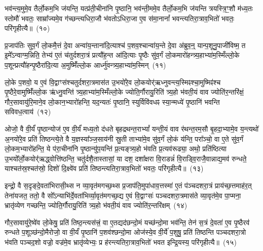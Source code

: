 भव॑न्त्य॒मुमे॒व तैर्लो॒कम॒भि ज॑यन्ति॒ यत्प्र॑ती॒चीना॑नि पृ॒ष्ठानि॒ भव॑न्ती॒ममे॒व तैर्लो॒कम॒भि ज॑यन्ति त्रयस्त्रि॒ꣳ॒शौ म॑ध्य॒तः स्तोमौ॑ भवतः॒ साम्रा᳚ज्यमे॒व ग॑च्छन्त्यधिरा॒जौ भ॑वतो\-ऽधिरा॒जा ए॒व स॑मा॒नानां᳚ भवन्त्यतिरा॒त्राव॒भितो॑ भवतः॒ परि॑गृहीत्यै॥~(१०)

{\anuvakamend[{पृ॒ष्ठानि॒ चतु॑स्त्रिꣳशच्च}]}%

प्र॒जा\-प॑तिः सुव॒र्गं लो॒कमै॒त्तं दे॒वा अन्वा॑य॒न्ताना॑दि॒त्याश्च॑ प॒शव॒श्चान्वा॑य॒न्ते दे॒वा अ॑ब्रुव॒न्॒ यान्प॒शूनु॒पाजी॑विष्म॒ त इ॒मे᳚\-ऽन्वाग्म॒न्निति॒ तेभ्य॑ ए॒तं च॑तुर्दशरा॒त्रं प्रत्यौ॑ह॒न्त आ॑दि॒त्याः पृ॒ष्ठैः सु॑व॒र्गं लो॒कमारो॑हन्त्र्य॒हाभ्या॑म॒स्मिँल्लो॒के प॒शून्प्रत्यौ॑हन्पृ॒ष्ठैरा॑दि॒त्या अ॒मुष्मिँ॑ल्लो॒क आर्ध्नु॑वन्त्र्य॒हाभ्या॑म॒स्मिन्~(११)

लो॒के प॒शवो॒ य ए॒वं वि॒द्वाꣳस॑श्चतुर्दशरा॒त्रमास॑त उ॒भयो॑रे॒व लो॒कयोर्॑ऋध्नुवन्त्य॒स्मिꣴश्चा॒मुष्मिꣴ॑श्च पृ॒ष्ठैरे॒वामुष्मिँ॑ल्लो॒क ऋ॑ध्नु॒वन्ति॑ त्र्य॒हाभ्या॑म॒स्मिँल्लो॒के ज्योति॒र्गौरायु॒रिति॑ त्र्य॒हो भ॑वती॒यं वाव ज्योति॑र॒न्तरि॑क्षं॒ गौर॒सावायु॑रि॒माने॒व लो॒कान॒भ्यारो॑हन्ति॒ यद॒न्यतः॑ पृ॒ष्ठानि॒ स्युर्विवि॑वधꣴ स्या॒न्मध्ये॑ पृ॒ष्ठानि॑ भवन्ति सविवध॒त्वाय॑~(१२)

ओजो॒ वै वी॒र्यं॑ पृ॒ष्ठान्योज॑ ए॒व वी॒र्यं॑ मध्य॒तो द॑धते बृहद्रथन्त॒रा\-भ्यां᳚ यन्ती॒यं वाव र॑थन्त॒रम॒सौ बृ॒हदा॒भ्यामे॒व य॒न्त्यथो॑ अ॒नयो॑रे॒व प्रति॑ तिष्ठन्त्ये॒ते वै य॒ज्ञस्या᳚ञ्ज॒साय॑नी स्रु॒ती ताभ्या॑मे॒व सु॑व॒र्गं लो॒कं य॑न्ति॒ परा᳚ञ्चो॒ वा ए॒ते सु॑व॒र्गं लो॒कम॒भ्यारो॑हन्ति॒ ये प॑रा॒चीना॑नि पृ॒ष्ठान्यु॑प॒यन्ति॑ प्र॒त्यङ्त्र्य॒हो भ॑वति प्र॒त्यव॑रूढ्या॒ अथो॒ प्रति॑ष्ठित्या उ॒भयो᳚र्लो॒कयोर्॑\mbox{}॑ऋद्ध्वोत्ति॑ष्ठन्ति॒ चतु॑र्दशै॒तास्तासां॒ या दश॒ दशा᳚क्षरा वि॒राडन्नं॑ वि॒राड्वि॒राजै॒वान्नाद्य॒मव॑ रुन्धते॒ याश्चत॑स्र॒श्चत॑स्रो॒ दिशो॑ दि॒क्ष्वे॑व प्रति॑ तिष्ठन्त्यतिरा॒त्राव॒भितो॑ भवतः॒ परि॑गृहीत्यै॥~(१३)

{\anuvakamend[{आर्ध्नु॑वन्त्र्य॒हाभ्या॑म॒स्मिन्थ्स॑विवध॒त्वाय॒ प्रति॑ष्ठित्या॒ एक॑त्रिꣳशच्च}]}%

इन्द्रो॒ वै स॒दृङ्दे॒वता॑भिरासी॒थ्स न व्या॒वृत॑मगच्छ॒थ्स प्र॒जा\-प॑ति॒मुपा॑धाव॒त्तस्मा॑ ए॒तं प॑ञ्चदशरा॒त्रं प्राय॑च्छ॒त्तमाह॑र॒त् तेना॑यजत॒ ततो॒ वै सो᳚\-ऽन्याभि॑र्दे॒वता॑भिर्व्या॒वृत॑मगच्छ॒द्य ए॒वं वि॒द्वाꣳसः॑ पञ्चदशरा॒त्रमास॑ते व्या॒वृत॑मे॒व पा॒प्मना॒ भ्रातृ॑व्येण गच्छन्ति॒ ज्योति॒र्गौरायु॒रिति॑ त्र्य॒हो भ॑वती॒यं वाव ज्योति॑र॒न्तरि॑क्षम्~(१४)

गौर॒सावायु॑रे॒ष्वे॑व लो॒केषु॒ प्रति॑ तिष्ठ॒न्त्यस॑त्त्रं॒ वा ए॒तद्यद॑छन्दो॒मं यच्छ॑न्दो॒मा भव॑न्ति॒ तेन॑ स॒त्रं दे॒वता॑ ए॒व पृ॒ष्ठैरव॑ रुन्धते प॒शूञ्छ॑न्दो॒मैरोजो॒ वा वी॒र्यं॑ पृ॒ष्ठानि॑ प॒शव॑श्छन्दो॒मा ओज॑स्ये॒व वी॒र्ये॑ प॒शुषु॒ प्रति॑ तिष्ठन्ति पञ्चदशरा॒त्रो भ॑वति पञ्चद॒शो वज्रो॒ वज्र॑मे॒व भ्रातृ॑व्येभ्यः॒ प्र ह॑रन्त्यतिरा॒त्राव॒भितो॑ भवत इन्द्रि॒यस्य॒ परि॑गृहीत्यै॥~(१५)

